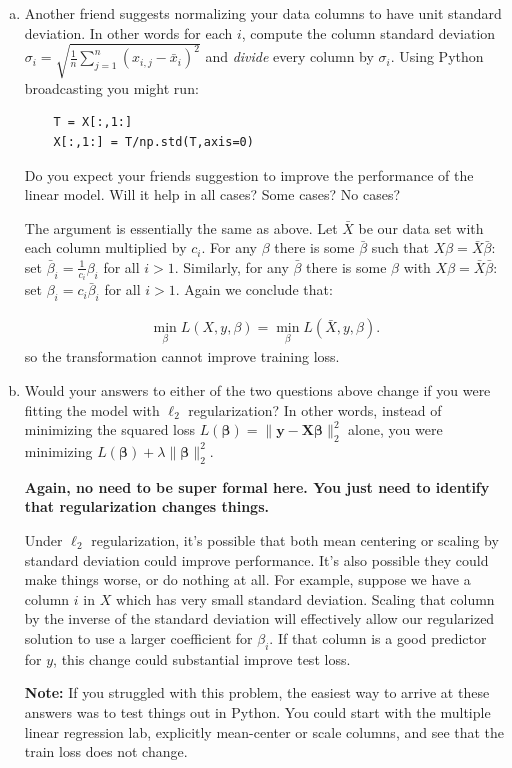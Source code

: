 \documentclass[10pt]{article}
\newcommand{\bs}[1]{\boldsymbol{#1}}
\newcommand{\bv}[1]{\mathbf{#1}}
\begin{document}
\begin{enumerate}[(a)]
	\item Another friend suggests normalizing your data columns to have unit standard deviation. In other words for each $i$, compute the column standard deviation $\sigma_i = \sqrt{\frac{1}{n}\sum_{j=1}^n (x_{i,j} - \bar{x}_i)^2}$ and \emph{divide} every column by $\sigma_i$. 
	Using Python broadcasting you might run:
	\begin{lstlisting}
	T = X[:,1:]
	X[:,1:] = T/np.std(T,axis=0)
	\end{lstlisting}
	Do you expect your friends suggestion to improve the performance of the linear model. Will it help in all cases? Some cases? No cases?
	
	\color{blue}
	The argument is essentially the same as above. Let $\bar{X}$ be our data set with each column multiplied by $c_i$. For 
	any $\beta$ there is some $\bar{\beta}$ such that $X\beta = \bar{X}\bar{\beta}$: set 
	$\bar{\beta}_i = \frac{1}{c_i}\beta_i$ for all $i > 1$. 
	Similarly, for any $\bar{\beta}$ there is some $\beta$ with 
	$X\beta = \bar{X}\bar{\beta}$: 
	set $\beta_i = c_i \bar{\beta}_i$ for all 
	$i > 1$.  Again we conclude that:
	
	\begin{align*}
	\min_\beta L(X,y,\beta) = 	\min_\beta L(\bar{X},y,\beta).
	\end{align*}
	so the transformation cannot improve training loss. 
	
	\color{black}
	
	\item Would your answers to either of the two questions above change if you were fitting the model with $\ell_2$ regularization? In other words, instead of minimizing the squared loss $L(\bs{\beta}) = \|\bv{y} - \bv{X}\bs{\beta}\|_2^2$ alone, you were minimizing $L(\bs{\beta}) + \lambda\|\bs{\beta}\|_2^2$. 
	
	\color{blue}
	\textbf{Again, no need to be super formal here. You just need to identify that regularization changes things.}
	
	Under $\ell_2$ regularization, it's possible that both mean centering or scaling by standard deviation could improve performance. It's also possible they could make things worse, or do nothing at all. For example, suppose we have a column $i$ in $X$ which has very small standard deviation. Scaling that column by the inverse of the standard deviation will effectively allow our regularized solution to use a larger coefficient for $\beta_i$. If that column is a good predictor for $y$, this change could substantial improve test loss. 
	\color{black}

	\textbf{Note:} If you struggled with this problem,  the easiest way to arrive at these answers was to  test things out in Python. You could start with the multiple linear regression lab, explicitly mean-center or scale columns, and see that the train loss does not change. 
\end{enumerate}
\end{document}

